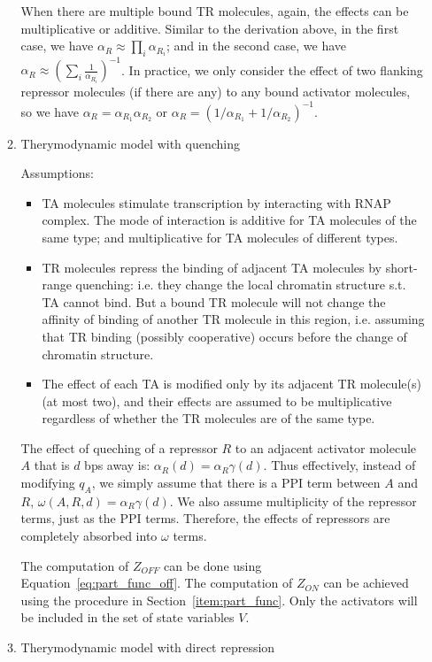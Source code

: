 \documentclass[11pt]{article}
\begin{document}
\begin{enumerate}
\begin{enumerate}
When there are multiple bound TR molecules, again, the effects can be multiplicative or additive. Similar to the derivation above, in the first case, we have $\alpha_R \approx \prod_i{\alpha_{R_i}}$; and in the second case, we have $\alpha_R \approx (\sum_i{\frac{1}{\alpha_{R_i}}})^{-1}$. In practice, we only consider the effect of two flanking repressor molecules (if there are any) to any bound activator molecules, so we have $\alpha_R = \alpha_{R_1} \alpha_{R_2}$ or $\alpha_R = (1/\alpha_{R_1} + 1/\alpha_{R_2})^{-1}$. 

\item{Therymodynamic model with quenching}

Assumptions: 
\begin{itemize}
\item TA molecules stimulate transcription by interacting with RNAP complex. The mode of interaction is additive for TA molecules of the same type; and multiplicative for TA molecules of different types. 
\item TR molecules repress the binding of adjacent TA molecules by short-range quenching: i.e. they change the local chromatin structure s.t. TA cannot bind. But a bound TR molecule will not change the affinity of binding of another TR molecule in this region, i.e. assuming that TR binding (possibly cooperative) occurs before the change of chromatin structure. 
\item The effect of each TA is modified only by its adjacent TR molecule(s) (at most two), and their effects are assumed to be multiplicative regardless of whether the TR molecules are of the same type. 
\end{itemize}

The effect of queching of a repressor $R$ to an adjacent activator molecule $A$ that is $d$ bps away is: $\alpha_R(d) = \alpha_R \gamma(d)$. Thus effectively, instead of modifying $q_A$, we simply assume that there is a PPI term between $A$ and $R$, $\omega(A,R,d) = \alpha_R \gamma(d)$. We also assume multiplicity of the repressor terms, just as the PPI terms. Therefore, the effects of repressors are completely absorbed into $\omega$ terms. 

The computation of $Z_{OFF}$ can be done using Equation~\ref{eq:part_func_off}. The computation of $Z_{ON}$ can be achieved using the procedure in Section~\ref{item:part_func}. Only the activators will be included in the set of state variables $V$. 

\item{Therymodynamic model with direct repression}


\end{enumerate}
\end{enumerate}
\end{document}
